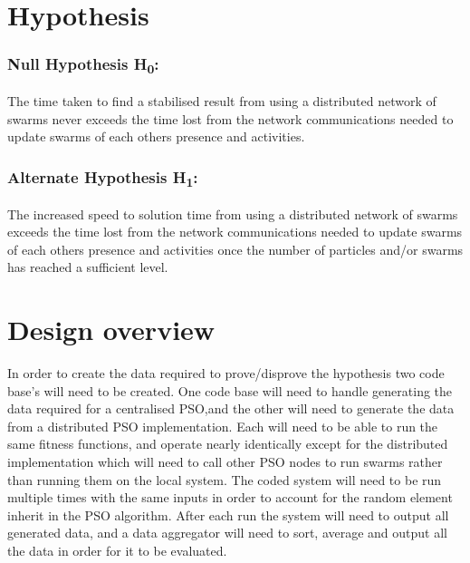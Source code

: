 \documentclass[oneside,12pt]{book}
\begin{document}
\section{Hypothesis}
\subsubsection{Null Hypothesis H\textsubscript{0}:}
The time taken to find a stabilised result from using a distributed network of swarms never exceeds the time lost from the network communications needed to update swarms of each others presence and activities.

\subsubsection{Alternate Hypothesis H\textsubscript{1}:}
The increased speed to solution time from using a distributed network of swarms exceeds the time lost from the network communications needed to update swarms of each others presence and activities once the number of particles and/or swarms has reached a sufficient level.

\section{Design overview}
In order to create the data required to prove/disprove the hypothesis two code base's will need to be created. One code base will need to handle generating the data required for a centralised PSO,and the other will need to generate the data from a distributed PSO implementation. Each will need to be able to run the same fitness functions, and operate nearly identically except for the distributed implementation which will need to call other PSO nodes to run swarms rather than running them on the local system. 
The coded system will need to be run multiple times with the same inputs in order to account for the random element inherit in the PSO algorithm. After each run the system will need to output all generated data, and a data aggregator will need to sort, average and output all the data in order for it to be evaluated.
\end{document}
